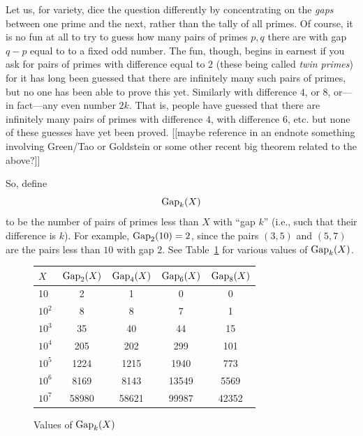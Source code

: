 \documentclass[11pt]{article}
\theoremstyle{plain}
\theoremstyle{definition}
\numberwithin{equation}{section}
\numberwithin{figure}{section}
\numberwithin{table}{section}
\begin{document}
Let us, for variety, dice the question differently by concentrating on
the {\em gaps} between one prime and the next, rather than the tally
of all primes. Of course, it is no fun at all to try to guess how many
pairs of primes $p, q$ there are with gap $q-p$ equal to to a fixed
odd number.  The fun, though, begins in earnest if you ask for pairs
of primes with difference equal to $2$ (these being called {\em twin
  primes}) for it has long been guessed that there are infinitely many
such pairs of primes, but no one has been able to prove this yet.
Similarly with difference $4$, or $8$, or---in fact---any even number
$2k$. That is, people have guessed that there are infinitely many
pairs of primes with difference $4$, with difference $6$, etc. but
none of these guesses have yet been proved. [[maybe reference in an
endnote something involving Green/Tao or Goldstein or some other
recent big theorem related to the above?]]
   
So, define $${\rm Gap}_{k}(X)$$ to be the number of pairs of primes
less than $X$ with ``gap $k$'' (i.e., such that their difference is
$k$).  For example, ${\rm Gap}_2(10) = 2$, since the pairs $(3,5)$ and
$(5,7)$ are the pairs less than $10$ with gap $2$.
See Table~\ref{tab:gap} for various values of ${\rm Gap}_{k}(X)$.
   
   \bigskip
   
\begin{figure}
\begin{center}
\caption{Values of ${\rm Gap}_{k}(X)$ \label{tab:gap}}
\vspace{1em}

\begin{tabular}{|l|c|c|c|c|}\hline
$X$ & ${\rm Gap}_{2}(X)$ & ${\rm Gap}_{4}(X)$& ${\rm Gap}_{6}(X)$ & ${\rm Gap}_{8}(X)$\\\hline
10 & 2 & 1 & 0 & 0\\\hline
$10^2$ & 8 & 8 & 7 & 1 \\\hline
$10^3$ & 35 & 40 & 44 & 15 \\\hline
$10^4$ & 205 & 202 & 299 & 101 \\\hline
$10^5$ & 1224 & 1215 & 1940 & 773 \\\hline
$10^6$ & 8169 & 8143 & 13549 & 5569 \\\hline
$10^7$ & 58980 & 58621 & 99987 & 42352 \\\hline
\end{tabular}
\end{center}
\end{figure}   
\end{document}
